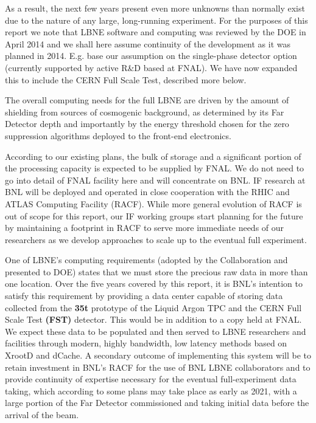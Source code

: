 \documentclass[pdftex,12pt,letter]{article}
\begin{document}
As a result, the next few years present even more unknowns than
normally exist due to the nature of any large, long-running
experiment. For the purposes of this report we note that LBNE software
and computing was reviewed by the DOE in April 2014 and we shall here
assume continuity of the development as it was planned in 2014.  
E.g. base our assumption on the single-phase detector option
(currently supported by active R\&D based at FNAL).
We have now expanded this to include the CERN Full Scale Test,
described more below.

The overall computing needs for the full LBNE are driven by the amount
of shielding from sources of cosmogenic background, as determined by
its Far Detector depth and importantly by the energy threshold chosen
for the zero suppression algorithms deployed to the front-end
electronics.

According to our existing plans, the bulk of storage and a significant
portion of the processing capacity is expected to be supplied by
FNAL. 
We do not need to go into detail of FNAL facility here and will
concentrate on BNL.
IF research at BNL will be deployed and operated in close cooperation
with the RHIC and ATLAS
Computing Facility (RACF). 
While more general evolution of  RACF  is
out of scope for this report,
our IF working groups start planning for the future by maintaining a
footprint in RACF to serve more
immediate needs of our researchers as we develop approaches to scale
up to the eventual full
experiment.


One of LBNE's computing requirements (adopted by the Collaboration and
presented to DOE) states that we must store the precious raw data in
more than one location.
Over the five years covered by this report, it is BNL's intention to
satisfy this requirement by providing a data center capable of storing
data collected from the \textbf{35t} prototype of the Liquid Argon TPC
and the CERN Full Scale Test \textbf{(FST)} detector.
This would be in addition to a copy held at FNAL.
We expect these data to be populated and then served to LBNE
researchers and facilities through modern, highly bandwidth, low
latency methods based on XrootD and dCache.
A secondary outcome of implementing this system will be to retain
investment in BNL's RACF for the use of BNL LBNE collaborators and to
provide continuity of expertise necessary for the eventual
full-experiment data taking, which according to some plans may take
place as early as 2021, with a large portion of the Far Detector
commissioned and taking initial data before the arrival of the beam.
\end{document}
